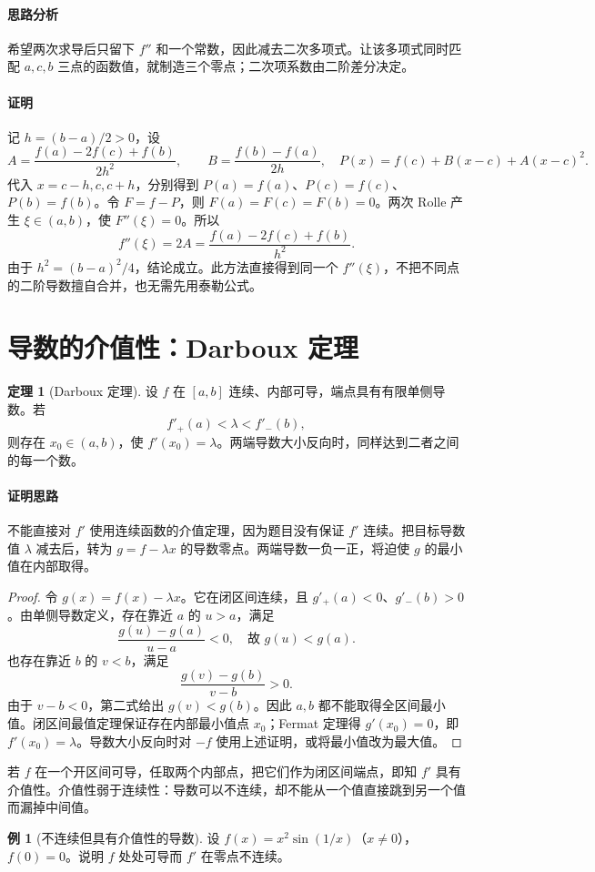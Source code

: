\documentclass[UTF8,fontset=fandol,12pt,oneside,openany]{ctexrep}
\theoremstyle{definition}
\newtheorem{theorem}{定理}[chapter]
\newtheorem{example}{例}[chapter]
\begin{document}
\paragraph{思路分析}
希望两次求导后只留下 $f''$ 和一个常数，因此减去二次多项式。让该多项式同时匹配 $a,c,b$ 三点的函数值，就制造三个零点；二次项系数由二阶差分决定。
\paragraph{证明}
记 $h=(b-a)/2>0$，设
\[
A=\frac{f(a)-2f(c)+f(b)}{2h^2},\qquad
B=\frac{f(b)-f(a)}{2h},
\quad P(x)=f(c)+B(x-c)+A(x-c)^2.
\]
代入 $x=c-h,c,c+h$，分别得到 $P(a)=f(a)$、$P(c)=f(c)$、$P(b)=f(b)$。令 $F=f-P$，则 $F(a)=F(c)=F(b)=0$。两次 Rolle 产生 $\xi\in(a,b)$，使 $F''(\xi)=0$。所以
\[
f''(\xi)=2A=\frac{f(a)-2f(c)+f(b)}{h^2}.
\]
由于 $h^2=(b-a)^2/4$，结论成立。此方法直接得到同一个 $f''(\xi)$，不把不同点的二阶导数擅自合并，也无需先用泰勒公式。

\section{导数的介值性：Darboux 定理}
\begin{theorem}[Darboux 定理]\label{lec:06:darboux}
设 $f$ 在 $[a,b]$ 连续、内部可导，端点具有有限单侧导数。若
\[
f'_+(a)<\lambda<f'_-(b),
\]
则存在 $x_0\in(a,b)$，使 $f'(x_0)=\lambda$。两端导数大小反向时，同样达到二者之间的每一个数。
\end{theorem}
\paragraph{证明思路}
不能直接对 $f'$ 使用连续函数的介值定理，因为题目没有保证 $f'$ 连续。把目标导数值 $\lambda$ 减去后，转为 $g=f-\lambda x$ 的导数零点。两端导数一负一正，将迫使 $g$ 的最小值在内部取得。
\begin{proof}
令 $g(x)=f(x)-\lambda x$。它在闭区间连续，且 $g'_+(a)<0$、$g'_-(b)>0$。由单侧导数定义，存在靠近 $a$ 的 $u>a$，满足
\[
\frac{g(u)-g(a)}{u-a}<0,
\quad\text{故 }g(u)<g(a).
\]
也存在靠近 $b$ 的 $v<b$，满足
\[
\frac{g(v)-g(b)}{v-b}>0.
\]
由于 $v-b<0$，第二式给出 $g(v)<g(b)$。因此 $a,b$ 都不能取得全区间最小值。闭区间最值定理保证存在内部最小值点 $x_0$；Fermat 定理得 $g'(x_0)=0$，即 $f'(x_0)=\lambda$。导数大小反向时对 $-f$ 使用上述证明，或将最小值改为最大值。
\end{proof}
若 $f$ 在一个开区间可导，任取两个内部点，把它们作为闭区间端点，即知 $f'$ 具有介值性。介值性弱于连续性：导数可以不连续，却不能从一个值直接跳到另一个值而漏掉中间值。
\begin{example}[不连续但具有介值性的导数]
设 $f(x)=x^2\sin(1/x)$（$x\ne0$），$f(0)=0$。说明 $f$ 处处可导而 $f'$ 在零点不连续。
\end{example}
\end{document}
